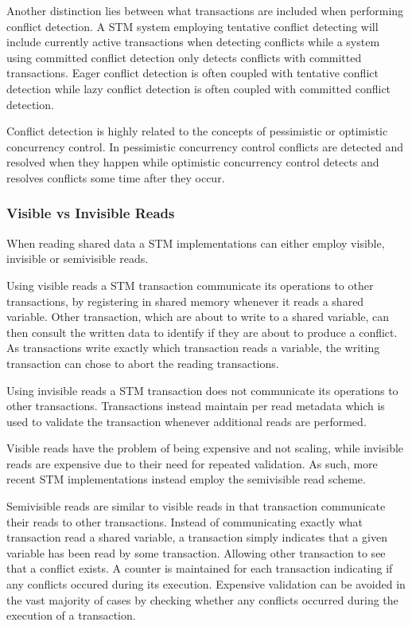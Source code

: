 Another distinction lies between what transactions are included when performing conflict detection. A \ac{STM} system employing tentative conflict detecting will include currently active transactions when detecting conflicts while a system using committed conflict detection only detects conflicts with committed transactions. Eager conflict detection is often coupled with tentative conflict detection while lazy conflict detection is often coupled with committed conflict detection\cite[p. 22]{harris2010transactional}.  

Conflict detection is highly related to the concepts of pessimistic or optimistic concurrency control. In pessimistic concurrency control conflicts are detected and resolved when they happen\cite[p. 20]{harris2010transactional} while optimistic concurrency control detects and resolves conflicts some time after they occur\cite[p. 20]{harris2010transactional}.

\subsubsection{Visible vs Invisible Reads}
When reading shared data a \ac{STM} implementations can either employ visible, invisible or semivisible reads.

Using visible reads a \ac{STM} transaction communicate its operations to other transactions, by registering in shared memory whenever it reads a shared variable\cite[p. 2]{lev2009anatomy}\cite[p. 2085]{herlihy2011tm}. Other transaction, which are about to write to a shared variable, can then consult the written data to identify if they are about to produce a conflict. As transactions write exactly which transaction reads a variable, the writing transaction can chose to abort the reading transactions\cite[p. 2]{lev2009anatomy}.

Using invisible reads a \ac{STM} transaction does not communicate its operations to other transactions\cite[p. 114]{imbs2012virtual}. Transactions instead maintain per read metadata which is used to validate the transaction whenever additional reads are performed\cite[p. 2085]{herlihy2011tm}.

Visible reads have the problem of being expensive and not scaling, while invisible reads are expensive due to their need for repeated validation. As such, more recent \ac{STM} implementations instead employ the semivisible read scheme\cite[p. 2085]{herlihy2011tm}.

Semivisible reads are similar to visible reads in that transaction communicate their reads to other transactions. Instead of communicating exactly what transaction read a shared variable, a transaction simply indicates that a given variable has been read by some transaction. Allowing other transaction to see that a conflict exists. A counter is maintained for each transaction indicating if any conflicts occured during its execution. Expensive validation can be avoided in the vast majority of cases by checking whether any conflicts occurred during the execution of a transaction\cite[p. 2]{lev2009anatomy}.

